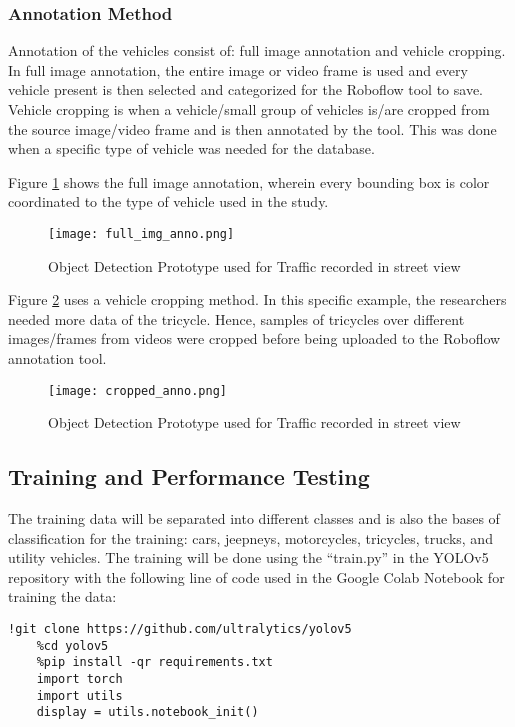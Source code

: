 	
\subsubsection{Annotation Method}
Annotation of the vehicles consist of: full image annotation and vehicle cropping. In full image annotation, the entire image or video frame is used and every vehicle present is then selected and categorized for the Roboflow tool to save. Vehicle cropping is when a vehicle/small group of vehicles is/are cropped from the source image/video frame and is then annotated by the tool. This was done when a specific type of vehicle was needed for the database.

Figure \ref{fig:full_img_anno} shows the full image annotation, wherein every bounding box is color coordinated to the type of vehicle used in the study.

\begin{figure}[h!]
	\texttt{[image: full\_img\_anno.png]}
	\caption{Object Detection Prototype used for Traffic recorded in street view}
	\label{fig:full_img_anno}
\end{figure}

Figure \ref{fig:cropped_anno} uses a vehicle cropping method. In this specific example, the researchers needed more data of the tricycle. Hence, samples of tricycles over different images/frames from videos were cropped before being uploaded to the Roboflow annotation tool. 

\begin{figure}[h!]
	\texttt{[image: cropped\_anno.png]}
	\caption{Object Detection Prototype used for Traffic recorded in street view}
	\label{fig:cropped_anno}
\end{figure}

\newpage

\subsection {Training and Performance Testing}

The training data will be separated into different classes and is also the bases of classification for the training: cars, jeepneys, motorcycles, tricycles, trucks, and utility vehicles. The training will be done using the “train.py” in the YOLOv5 repository with the following line of code used in the Google Colab Notebook for training the data:


\begin{lstlisting}[frame=single]
	!git clone https://github.com/ultralytics/yolov5
	%cd yolov5
	%pip install -qr requirements.txt
	import torch
	import utils
	display = utils.notebook_init()
	
	
\end{lstlisting}

